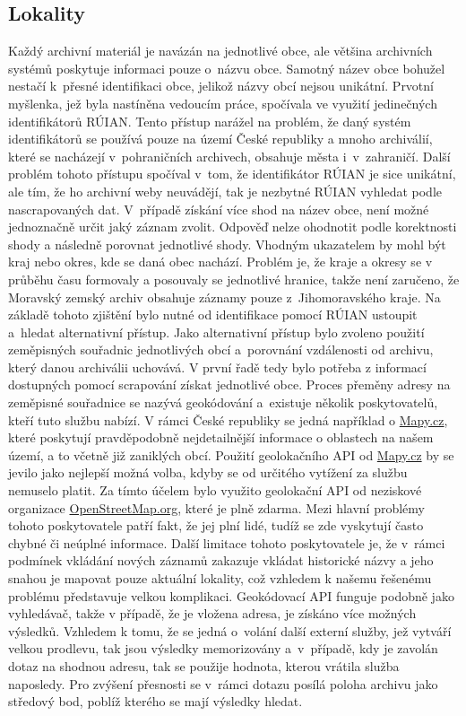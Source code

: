 \subsection{Lokality}
Každý archivní materiál je navázán na jednotlivé obce, ale většina archivních systémů poskytuje informaci pouze o~názvu obce. Samotný název obce bohužel nestačí k~přesné identifikaci obce, jelikož názvy obcí nejsou unikátní. Prvotní myšlenka, jež byla nastíněna vedoucím práce, spočívala ve využití jedinečných identifikátorů RÚIAN. Tento přístup narážel na problém, že daný systém identifikátorů se používá pouze na území České republiky a mnoho archiválií, které se nacházejí v~pohraničních archivech, obsahuje města i~v~zahraničí. Další problém tohoto přístupu spočíval v~tom, že identifikátor RÚIAN je sice unikátní, ale tím, že ho archivní weby neuvádějí, tak je nezbytné RÚIAN vyhledat podle nascrapovaných dat. V~případě získání více shod na název obce, není možné jednoznačně určit jaký záznam zvolit. Odpověď nelze ohodnotit podle korektnosti shody a následně porovnat jednotlivé shody. Vhodným ukazatelem by mohl být kraj nebo okres, kde se daná obec nachází. Problém je, že kraje a okresy se v průběhu času formovaly a posouvaly se jednotlivé hranice, takže není zaručeno, že Moravský zemský archiv obsahuje záznamy pouze z~Jihomoravského kraje. Na základě tohoto zjištění bylo nutné od identifikace pomocí RÚIAN ustoupit a~hledat alternativní přístup. Jako alternativní přístup bylo zvoleno použití zeměpisných souřadnic jednotlivých obcí a~porovnání vzdálenosti od archivu, který danou archiválii uchovává.
\newpara
V první řadě tedy bylo potřeba z informací dostupných pomocí scrapování získat jednotlivé obce. Proces přeměny adresy na zeměpisné souřadnice se nazývá geokódování a~existuje několik poskytovatelů, kteří tuto službu nabízí. V rámci České republiky se jedná například o \href{https://www.mapy.cz}{Mapy.cz}, které poskytují pravděpodobně nejdetailnější informace o oblastech na našem území, a to včetně již zaniklých obcí. Použití geolokačního API od \href{https://www.mapy.cz}{Mapy.cz} by se jevilo jako nejlepší možná volba, kdyby se od určitého vytížení za službu nemuselo platit. Za tímto účelem bylo využito geolokační API od neziskové organizace \href{https://www.openstreetmap.org/}{OpenStreetMap.org}, které je plně zdarma. Mezi hlavní problémy tohoto poskytovatele patří fakt, že jej plní lidé, tudíž se zde vyskytují často chybné či neúplné informace. Další limitace tohoto poskytovatele je, že v~rámci podmínek vkládání nových záznamů zakazuje vkládat historické názvy a jeho snahou je mapovat pouze aktuální lokality, což vzhledem k našemu řešenému problému představuje velkou komplikaci. Geokódovací API funguje podobně jako vyhledávač, takže v případě, že je vložena adresa, je získáno více možných výsledků. Vzhledem k tomu, že se jedná o~volání další externí služby, jež vytváří velkou prodlevu, tak jsou výsledky memorizovány a~v~případě, kdy je zavolán dotaz na shodnou adresu, tak se použije hodnota, kterou vrátila služba naposledy. Pro zvýšení přesnosti se v~rámci dotazu posílá poloha archivu jako středový bod, poblíž kterého se mají výsledky hledat.
